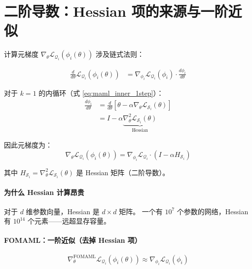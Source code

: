 \section{二阶导数：Hessian 项的来源与一阶近似}
\label{sec:maml_hessian}

计算元梯度 $\nabla_\theta \mathcal{L}_{\mathcal{Q}_i}(\phi_i(\theta))$ 涉及链式法则：

\begin{align}
  \frac{d}{d\theta} \mathcal{L}_{\mathcal{Q}_i}(\phi_i(\theta))
  &= \nabla_{\phi_i} \mathcal{L}_{\mathcal{Q}_i}(\phi_i) \cdot \frac{d\phi_i}{d\theta}
  \label{eq:chain_rule}
\end{align}

对于 $k=1$ 的内循环（式 \eqref{eq:maml_inner_1step}）：
\begin{align}
  \frac{d\phi_i}{d\theta}
  &= \frac{d}{d\theta} \left[ \theta - \alpha \nabla_\theta \mathcal{L}_{\mathcal{S}_i}(\theta) \right] \\
  &= I - \alpha \underbrace{\nabla^2_\theta \mathcal{L}_{\mathcal{S}_i}(\theta)}_{\text{Hessian}}
  \label{eq:maml_jacobian}
\end{align}

因此元梯度为：
\begin{equation}
  \nabla_\theta \mathcal{L}_{\mathcal{Q}_i}(\phi_i(\theta)) = 
  \nabla_{\phi_i} \mathcal{L}_{\mathcal{Q}_i} \cdot \left( I - \alpha H_{\mathcal{S}_i} \right)
  \label{eq:maml_full_grad}
\end{equation}

其中 $H_{\mathcal{S}_i} = \nabla^2_\theta \mathcal{L}_{\mathcal{S}_i}(\theta)$ 是 Hessian 矩阵（二阶导数）。

\paragraph{为什么 Hessian 计算昂贵}

对于 $d$ 维参数向量，Hessian 是 $d \times d$ 矩阵。
一个有 $10^7$ 个参数的网络，Hessian 有 $10^{14}$ 个元素——远超显存容量。

\paragraph{FOMAML：一阶近似（去掉 Hessian 项）}

\begin{equation}
  \nabla_\theta^{\text{FOMAML}} \mathcal{L}_{\mathcal{Q}_i}(\phi_i(\theta)) \approx 
  \nabla_{\phi_i} \mathcal{L}_{\mathcal{Q}_i}(\phi_i)
  \label{eq:fomaml}
\end{equation}

